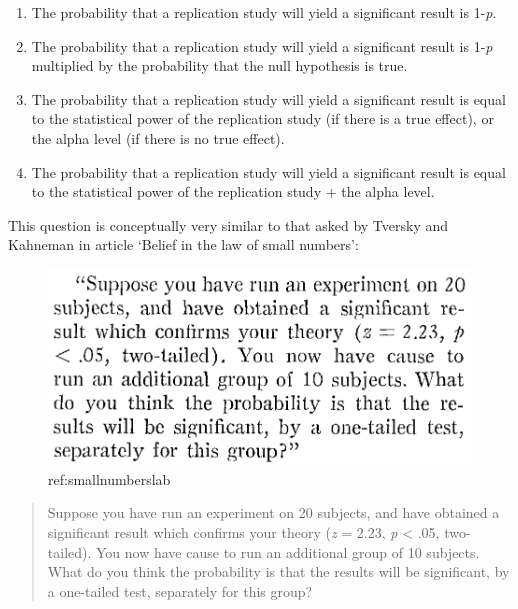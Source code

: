 \documentclass[
  oneside]{book}
\providecommand{\tightlist}{%
  \setlength{\itemsep}{0pt}\setlength{\parskip}{0pt}}
\begin{document}
\begin{enumerate}
\def\labelenumi{\Alph{enumi})}
\tightlist
\item
  The probability that a replication study will yield a significant result is 1-\emph{p}.
\item
  The probability that a replication study will yield a significant result is 1-\emph{p} multiplied by the probability that the null hypothesis is true.
\item
  The probability that a replication study will yield a significant result is equal to the statistical power of the replication study (if there is a true effect), or the alpha level (if there is no true effect).
\item
  The probability that a replication study will yield a significant result is equal to the statistical power of the replication study + the alpha level.
\end{enumerate}

This question is conceptually very similar to that asked by Tversky and Kahneman \citeyearpar{tversky_belief_1971} in article `Belief in the law of small numbers':



\begin{figure}

{\centering \includegraphics[width=1\linewidth]{images/belieflawsmallnumers} 

}

\caption{ref:smallnumberslab}\label{fig:smallnumbers}
\end{figure}

\begin{quote}
Suppose you have run an experiment on 20 subjects, and have obtained a significant result which confirms your theory (\emph{z} = 2.23, \emph{p} \textless{} .05, two-tailed). You now have cause to run an additional group of 10 subjects. What do you think the probability is that the results will be significant, by a one-tailed test, separately for this group?
\end{quote}
\end{document}

